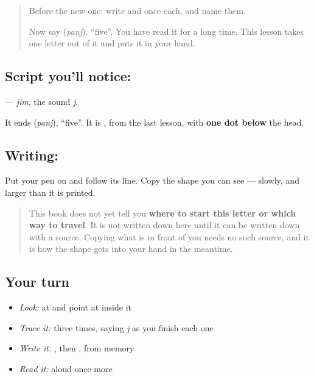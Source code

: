 \label{lesson:FA-W23-jim}



\begin{quote}
Before the new one: write  and  once each, and name them.

Now say \textbf{} (\emph{panj}), \textquotedblleft{}five\textquotedblright{}. You have read it for a long time. This lesson takes one letter out of it and puts it in your hand.
\end{quote}

\subsection*{Script you'll notice: }
\textbf{} — \emph{jim}, the sound \emph{j}.

It ends \textbf{} (\emph{panj}), \textquotedblleft{}five\textquotedblright{}. It is \textbf{}, from the last lesson, with \textbf{one dot below} the head.

\subsection*{Writing: }
Put your pen on  and follow its line. Copy the shape you can see — slowly, and larger than it is printed.

\begin{quote}
This book does not yet tell you \textbf{where to start this letter or which way to travel}. It is not written down here until it can be written down with a source. Copying what is in front of you needs no such source, and it is how the shape gets into your hand in the meantime.
\end{quote}

\subsection*{Your turn}
\begin{itemize}
\raggedright
  \item \emph{Look:} at \textbf{} and point at  inside it
  \item \emph{Trace it:}  three times, saying \emph{j} as you finish each one
  \item \emph{Write it:} , then , from memory
  \item \emph{Read it:} \textbf{} aloud once more
\end{itemize}

